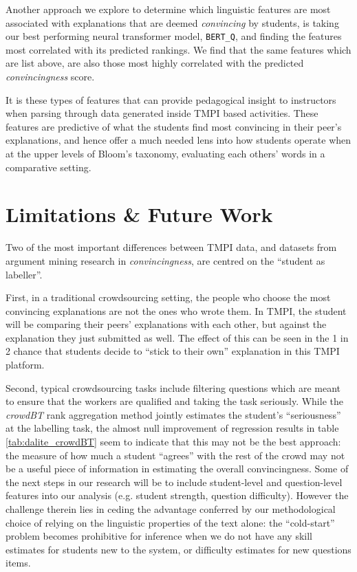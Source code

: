 \documentclass[notitlepage,12pt]{jedm}
\begin{document}
Another approach we explore to determine which linguistic features are most 
associated with explanations that are deemed \textit{convincing} by students, 
is taking our best performing neural transformer model, \verb|BERT_Q|, and 
finding the features most correlated with its predicted rankings. 
We find that the same features which are list above, are also those most highly 
correlated with the predicted \textit{convincingness} score.

It is these types of features that can provide pedagogical insight to 
instructors when parsing through data generated inside TMPI based activities.
These features are predictive of what the students find most convincing in 
their peer's explanations, and hence offer a much needed lens into how students 
operate when at the upper levels of Bloom's taxonomy, evaluating each others' 
words in a comparative setting.

\section{Limitations \& Future Work}

Two of the most important differences between TMPI data, and datasets from 
argument mining research in \textit{convincingness}, are centred on the 
``student as labeller''. 

First, in a traditional crowdsourcing setting, the people who choose the most 
convincing explanations are not the ones who wrote them.
In TMPI, the student will be comparing their peers' explanations with each 
other, but against the explanation they just submitted as well.
The effect of this can be seen in the 1 in 2 chance that students decide to 
``stick to their own'' explanation in this TMPI platform. 

Second, typical crowdsourcing tasks include filtering questions which are meant 
to ensure that the workers are qualified and taking the task seriously.
While the \textit{crowdBT} rank aggregation method jointly estimates the 
student's ``seriousness'' at the labelling task, the almost null improvement of 
regression results in table \ref{tab:dalite_crowdBT} seem to indicate that this 
may not be the best approach: the measure of how much a student ``agrees'' with 
the rest of the crowd may not be a useful piece of information in estimating 
the overall convincingness.
Some of the next steps in our research will be to include student-level and 
question-level features into our analysis (e.g. student strength, question 
difficulty).
However the challenge therein lies in ceding the advantage conferred by our 
methodological choice of relying on the linguistic properties of the text 
alone: the ``cold-start'' problem becomes prohibitive for inference when we do 
not have any skill estimates for students new to the system, or difficulty 
estimates for new questions items.
\end{document}
